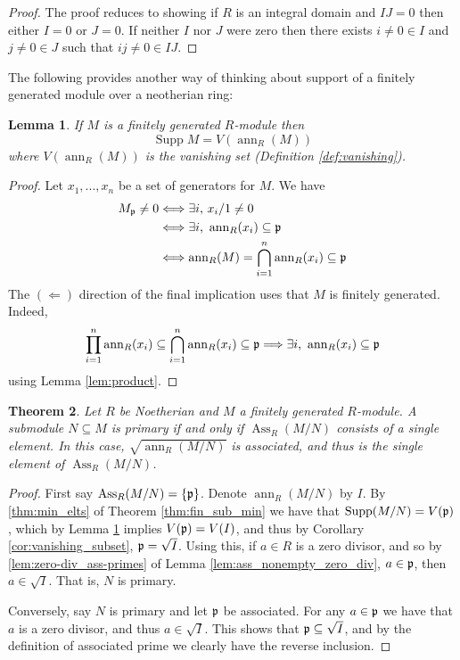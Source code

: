 \documentclass[12pt]{article}
\theoremstyle{plain}
\newtheorem{thm}{Theorem}[subsection] %
\newtheorem{lemma}[thm]{Lemma}
\theoremstyle{definition}
\begin{document}
\begin{proof}
The proof reduces to showing if $R$ is an integral domain and $IJ = 0$ then either $I = 0$ or $J = 0$. If neither $I$ nor $J$ were zero then there exists $i\neq 0 \in I$ and $j\neq 0 \in J$ such that $ij \neq 0 \in IJ$.
\end{proof}
The following provides another way of thinking about support of a finitely generated module over a neotherian ring:
\begin{lemma}
\label{lem:support_vanishing}
If $M$ is a finitely generated $R$-module then \[\operatorname{Supp}M = V(\operatorname{ann}_R(M))\]
where $V(\operatorname{ann}_R(M))$ is the vanishing set (Definition \ref{def:vanishing}).
\end{lemma}
\begin{proof}
Let $x_1,...,x_n$ be a set of generators for $M$. We have
\begin{align*}
    M_\frak{p} \neq 0 &\Longleftrightarrow \exists i\text{, }x_i/1 \neq 0\\
    &\Longleftrightarrow \exists i\text{, }\operatorname{ann}_R(x_i) \subseteq \frak{p}\\
    &\Longleftrightarrow \operatorname{ann}_R(M) = \bigcap_{i = 1}^n \operatorname{ann}_R(x_i) \subseteq \frak{p}
\end{align*}
The $(\Longleftarrow)$ direction of the final implication uses that $M$ is finitely generated. Indeed, \[\prod_{i = 1}^n \operatorname{ann}_R(x_i) \subseteq \bigcap_{i = 1}^n\operatorname{ann}_R(x_i) \subseteq \frak{p} \Longrightarrow \exists i\text{, }\operatorname{ann}_R(x_i) \subseteq \frak{p}\]
using Lemma \ref{lem:product}.
\end{proof}
\begin{thm}
\label{thm:primary_single_elt}
Let $R$ be Noetherian and $M$ a finitely generated $R$-module. A submodule $N \subseteq M$ is primary if and only if $\operatorname{Ass}_R(M/N)$ consists of a single element. In this case, $\sqrt{\operatorname{ann}_R(M/N)}$ is associated, and thus is the single element of $\operatorname{Ass}_R(M/N)$.
\end{thm}
\begin{proof}
First say $\operatorname{Ass}_R(M/N) = \lbrace \frak{p} \rbrace$. Denote $\operatorname{ann}_R(M/N)$ by $I$. By \eqref{thm:min_elts} of Theorem \ref{thm:fin_sub_min} we have that $\operatorname{Supp}(M/N) = V(\frak{p})$, which by Lemma \ref{lem:support_vanishing} implies $V(\frak{p}) = V(I)$, and thus by Corollary \ref{cor:vanishing_subset}, $\frak{p} = \sqrt{I}$. Using this, if $a \in R$ is a zero divisor, and so by \ref{lem:zero-div_ass-primes} of Lemma \ref{lem:ass_nonempty_zero_div}, $a \in \frak{p}$, then $a \in \sqrt{I}$. That is, $N$ is primary.

Conversely, say $N$ is primary and let $\frak{p}$ be associated. For any $a \in \frak{p}$ we have that $a$ is a zero divisor, and thus $a \in \sqrt{I}$. This shows that $\frak{p} \subseteq \sqrt{I}$, and by the definition of associated prime we clearly have the reverse inclusion.
\end{proof}
\end{document}
